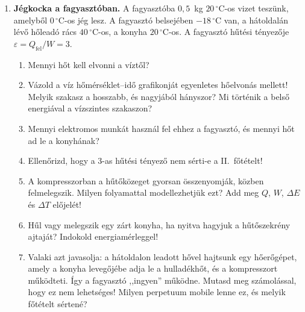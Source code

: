 \documentclass[11pt,a4paper]{article}
\begin{document}
\begin{enumerate}
\item \textbf{Jégkocka a fagyasztóban.} A fagyasztóba $0{,}5$~kg $20\,^\circ$C-os vizet
  teszünk, amelyből $0\,^\circ$C-os jég lesz. A fagyasztó belsejében $-18\,^\circ$C van, a
  hátoldalán lévő hőleadó rács $40\,^\circ$C-os, a konyha $20\,^\circ$C-os. A fagyasztó
  hűtési tényezője $\varepsilon = Q_\text{fel}/W = 3$.
  \begin{enumerate}
    \item Mennyi hőt kell elvonni a víztől?
    \item Vázold a víz hőmérséklet--idő grafikonját egyenletes hőelvonás mellett! Melyik
      szakasz a hosszabb, és nagyjából hányszor? Mi történik a belső energiával a
      vízszintes szakaszon?
    \item Mennyi elektromos munkát használ fel ehhez a fagyasztó, és mennyi hőt ad le a
      konyhának?
    \item Ellenőrizd, hogy a $3$-as hűtési tényező nem sérti-e a II.~főtételt!
    \item A kompresszorban a hűtőközeget gyorsan összenyomják, közben felmelegszik. Milyen
      folyamattal modellezhetjük ezt? Add meg $Q$, $W$, $\Delta E$ és $\Delta T$ előjelét!
    \item Hűl vagy melegszik egy zárt konyha, ha nyitva hagyjuk a hűtőszekrény ajtaját?
      Indokold energiamérleggel!
    \item Valaki azt javasolja: a hátoldalon leadott hővel hajtsunk egy hőerőgépet, amely a
      konyha levegőjébe adja le a hulladékhőt, és a kompresszort működteti. Így a fagyasztó
      ,,ingyen'' működne. Mutasd meg számolással, hogy ez nem lehetséges! Milyen perpetuum
      mobile lenne ez, és melyik főtételt sértené?
  \end{enumerate}
\end{enumerate}
\end{document}
